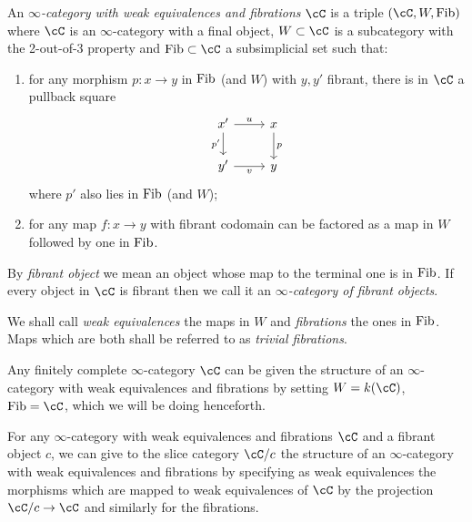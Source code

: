 \begin{defn}
  An \emph{$\infty$-category with weak equivalences and fibrations} $\cC$ is a
  triple
  $(\cC,W,\fib)$ where $\cC$ is an $\infty$-category with a final object,
  $W\subset\cC$ is a subcategory with the 2-out-of-3 property and
  $\fib\subset\cC$ a subsimplicial set such that:
  \begin{enumerate}
    \item for any morphism $p\colon x\rightarrow y$ in $\operatorname{Fib}$ (and $W$) with
      $y,y'$ fibrant, there is in $\cC$ a pullback square
      \[\begin{tikzcd}
        {x'} & x \\
        {y'} & y
        \arrow["p", from=1-2, to=2-2]
        \arrow["{p'}"', from=1-1, to=2-1]
        \arrow["v"', from=2-1, to=2-2]
        \arrow["u", from=1-1, to=1-2]
      \end{tikzcd}\]
      where $p'$ also lies in $\operatorname{Fib}$ (and $W$);
    \item for any map $f\colon x\rightarrow y$ with fibrant codomain can be
      factored as a map in $W$ followed by one in $\operatorname{Fib}$.
  \end{enumerate}
  By \emph{fibrant object} we mean an object whose map to the terminal one is in
  $\operatorname{Fib}$. If every object in $\cC$ is fibrant then we call it an
  \emph{$\infty$-category of fibrant objects}.

  \noindent
  We shall call \emph{weak equivalences} the maps in $W$ and \emph{fibrations}
  the ones in $\operatorname{Fib}$. Maps which are both shall be referred to as \emph{trivial
  fibrations}.

\end{defn}

\begin{construction}\label{fincomplarefib}
  Any finitely complete $\infty$-category $\cC$ can be given the structure of an
  $\infty$-category with weak equivalences and fibrations by setting $W=k(\cC)$,
  $\fib=\cC$, which we will be doing henceforth.
\end{construction}

\begin{construction}
  For any $\infty$-category with weak equivalences and fibrations $\cC$ and a
  fibrant object $c$, we can give to the slice category $\cC/c$ the structure of an
  $\infty$-category with weak equivalences and fibrations by specifying as weak
  equivalences the morphisms which are mapped to weak equivalences of $\cC$ by
  the projection $\cC/c\rightarrow\cC$ and similarly for the fibrations.
\end{construction}

